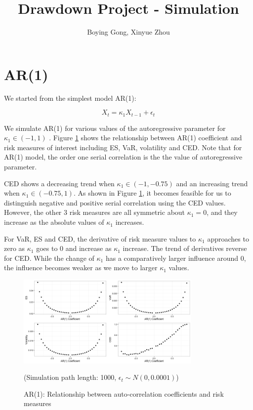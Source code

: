 \documentclass[11pt]{article}
\title{Drawdown Project - Simulation}
\author{Boying Gong, Xinyue Zhou}
\begin{document}
\maketitle

\tableofcontents

\clearpage

\section{AR(1)} %

We started from the simplest model AR(1):

\begin{equation}
X_t = \kappa_1X_{t-1} + \epsilon_t
\end{equation}

We simulate AR(1) for various values of the autoregressive parameter for $\kappa_1 \in (-1, 1)$ . Figure \ref{fig:AR1_risk_measures} shows the relationship between AR(1) coefficient and risk measures of interest including ES, VaR, volatility and CED. Note that for AR(1) model, the order one serial correlation is the the value of autoregressive parameter.

CED shows a decreasing trend when $\kappa_1\in(-1, -0.75)$ and an increasing trend when $\kappa_1 \in(-0.75, 1)$. As shown in Figure \ref{fig:AR1_risk_measures}, it becomes feasible for us to distinguish negative and positive serial correlation using the CED values. However, the other 3 risk measures are all symmetric about $\kappa_1 = 0$, and they increase as the absolute values of $\kappa_1$ increases.

For VaR, ES and CED, the derivative of risk measure values to $\kappa_1$ approaches to zero as  $\kappa_1$ goes to 0 and increase as $\kappa_1$ increase. The trend of derivatives reverse for CED. While the change of $\kappa_1$ has a comparatively larger influence around 0, the influence becomes weaker as we move to larger  $\kappa_1$ values.

\begin{figure}[H]
\centering
\includegraphics[width = 0.8\textwidth]{../figures/simulation/AR1_risk_measures}
\caption{AR(1): Relationship between auto-correlation coefficients and risk measures}
(Simulation path length: 1000, $\epsilon_t \sim N(0, 0.0001)$)
\label{fig:AR1_risk_measures}
\end{figure}
\end{document}
